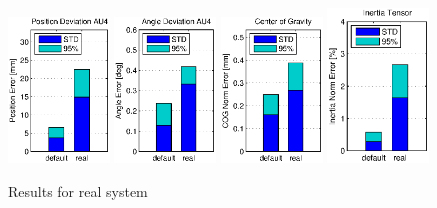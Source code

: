\begin{figure}[hbtp]
\centering
\includegraphics[width=0.24\textwidth]{images/results/err_cmp_real_pos.eps}
\includegraphics[width=0.24\textwidth]{images/results/err_cmp_real_angle.eps}
\includegraphics[width=0.24\textwidth]{images/results/err_cmp_real_cog.eps}
\includegraphics[width=0.24\textwidth]{images/results/err_cmp_real_tensor.eps}
\caption{Results for real system}
\label{fig:err_cmp_real}
\end{figure}

